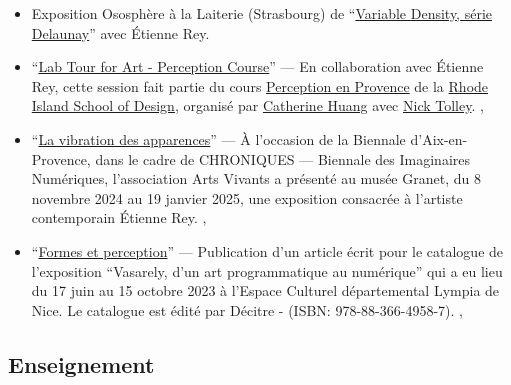 \documentclass[10pt,french,a4paper]{article}%
\newcommand{\years}[1]{\marginpar{\textit{\scriptsize #1}}}
\begin{document}
\begin{itemize}

	\item Exposition Ososphère à la Laiterie (Strasbourg) de ``\href{https://laurentperrinet.github.io/post/2026-02-20_ososphere/}{Variable Density, série Delaunay}'' avec Étienne Rey.
	
	\item ``\href{https://laurentperrinet.github.io/talk/2026-01-19-art-and-science}{Lab Tour for Art - Perception Course}'' --- En collaboration avec Étienne Rey, cette session fait partie du cours \href{https://www.risd.edu/academics/illustration/courses}{Perception en Provence} de la \href{https://www.risd.edu}{Rhode Island School of Design}, organisé par \href{https://www.instagram.com/cathuangart/}{Catherine Huang} avec \href{https://www.linkedin.com/in/ntolley/}{Nick Tolley}.	\years{2026},

	\item ``\href{https://laurentperrinet.github.io/post/2024-11-07_vibration-apparences/}{La vibration des apparences}'' --- À l’occasion de la Biennale d’Aix-en-Provence, dans le cadre de CHRONIQUES --- Biennale des Imaginaires Numériques, l’association Arts Vivants a présenté au musée Granet, du 8 novembre 2024 au 19 janvier 2025, une exposition consacrée à l’artiste contemporain Étienne Rey. \years{2024},
	
	\item ``\href{https://laurentperrinet.github.io/publication/perrinet-23-formes-et-perception/}{Formes et perception}'' --- Publication d’un article écrit pour le catalogue de l’exposition “Vasarely, d’un art programmatique au numérique” qui a eu lieu du 17 juin au 15 octobre 2023 à l’Espace Culturel départemental Lympia de Nice. Le catalogue est édité par Décitre - (ISBN: 978-88-366-4958-7). \years{2023},
	
\end{itemize}


\subsection{Enseignement} %
\end{document}
